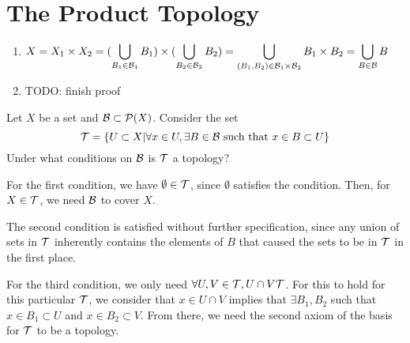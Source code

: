 \section{The Product Topology}


\begin{myproof}
	\begin{enumerate}
		\item $\displaystyle X = X_1\times X_2 = (\bigcup_{B_1\in\mathcal{B}_1}B_1)\times (\bigcup_{B_2\in\mathcal{B}_2}B_2) = \bigcup_{(B_1,B_2)\in\mathcal{B}_1\times\mathcal{B}_2}B_1\times B_2 = \bigcup_{B\in\mathcal{B}}B$
		\item TODO: finish proof
	\end{enumerate}
\end{myproof}


Let $X$ be a set and $\mathcal{B}\subset\mathcal{P}(X)$. Consider the set
$$\mathcal{T} = \{U\subset X|\forall x\in U,\exists B\in\mathcal{B} \text{ such that } x\in B\subset U\}$$
Under what conditions on $\mathcal{B}$ is $\mathcal{T}$ a topology?

For the first condition, we have $\emptyset\in\mathcal{T}$, since $\emptyset$ satisfies the condition. Then, for $X\in\mathcal{T}$, we need $\mathcal{B}$ to cover $X$.

The second condition is satisfied without further specification, since any union of sets in $\mathcal{T}$ inherently contains the elements of $B$ that caused the sets to be in $\mathcal{T}$ in the first place.

For the third condition, we only need $\forall U,V\in\mathcal{T}, U\cap V\mathcal{T}$. For this to hold for this particular $\mathcal{T}$, we consider that $x\in U\cap V$ implies that $\exists B_1,B_2$ such that $x\in B_1\subset U$ and $x\in B_2\subset V$. From there, we need the second axiom of the basis for $\mathcal{T}$ to be a topology.


